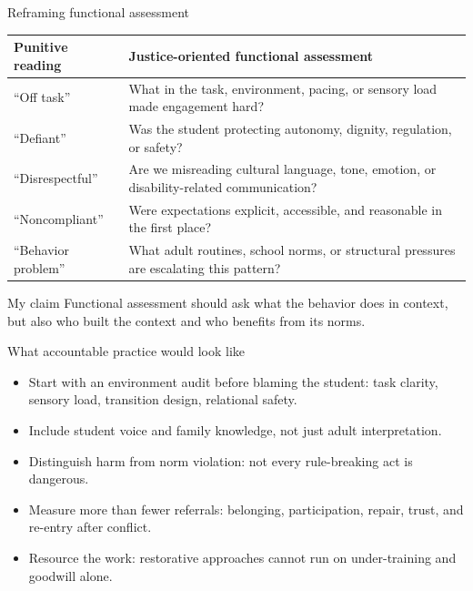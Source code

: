 \documentclass[aspectratio=169,11pt]{beamer}
\begin{document}
\begin{frame}{Reframing functional assessment}
\small
\begin{tabularx}{\textwidth}{>{\raggedright\arraybackslash}p{} >{\raggedright\arraybackslash}X}
\toprule
\textbf{Punitive reading} & \textbf{Justice-oriented functional assessment} \\
\midrule
``Off task'' & What in the task, environment, pacing, or sensory load made engagement hard? \\
``Defiant'' & Was the student protecting autonomy, dignity, regulation, or safety? \\
``Disrespectful'' & Are we misreading cultural language, tone, emotion, or disability-related communication? \\
``Noncompliant'' & Were expectations explicit, accessible, and reasonable in the first place? \\
``Behavior problem'' & What adult routines, school norms, or structural pressures are escalating this pattern? \\
\bottomrule
\end{tabularx}

\vspace{0.3cm}
\normalsize
\begin{block}{My claim}
Functional assessment should ask what the behavior does in context, but also who built the context and who benefits from its norms.
\end{block}
\end{frame}

\begin{frame}{What accountable practice would look like}
\begin{itemize}
  \item Start with an environment audit before blaming the student: task clarity, sensory load, transition design, relational safety.
  \item Include student voice and family knowledge, not just adult interpretation.
  \item Distinguish harm from norm violation: not every rule-breaking act is dangerous.
  \item Measure more than fewer referrals: belonging, participation, repair, trust, and re-entry after conflict.
  \item Resource the work: restorative approaches cannot run on under-training and goodwill alone.
\end{itemize}
\end{frame}
\end{document}
